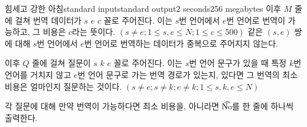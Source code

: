 \begin{problem}{힘세고 강한 아침}{standard input}{standard output}{2 seconds}{256 megabytes}
이후 $M$ 줄에 걸쳐 번역 데이터가 $s$ $e$ $c$ 꼴로 주어진다. 이는 $s$번 언어에서 $e$번 언어로 번역이 가능하고, 그 비용은 $c$라는 뜻이다. $( s \neq e; 1 \le s, e \le N ; 1 \le c \le 500)$ 같은 $(s , e)$ 쌍에 대해 $s$번 언어에서 $e$번 언어로 번역하는 데이터가 중복으로 주어지지 않는다.

이후 $Q$ 줄에 걸쳐 질문이 $s$ $k$ $e$ 꼴로 주어진다. 이는 $s$번 언어 문구가 있을 때 특정 $k$번 언어를 거치지 않고 $e$번 언어 문구로 가는 번역 경로가 있는지, 있다면 그 번역의 최소 비용은 얼마인지 질문하는 것이다. $(s \neq e; s \neq k ; e \neq k; 1 \le s, k, e \le N)$

\OutputFile
각 질문에 대해 만약 번역이 가능하다면 최소 비용을, 아니라면 \t{No}를 한 줄에 하나씩 출력한다.

\Examples

\begin{example}
%
%
\end{example}

\end{problem}


